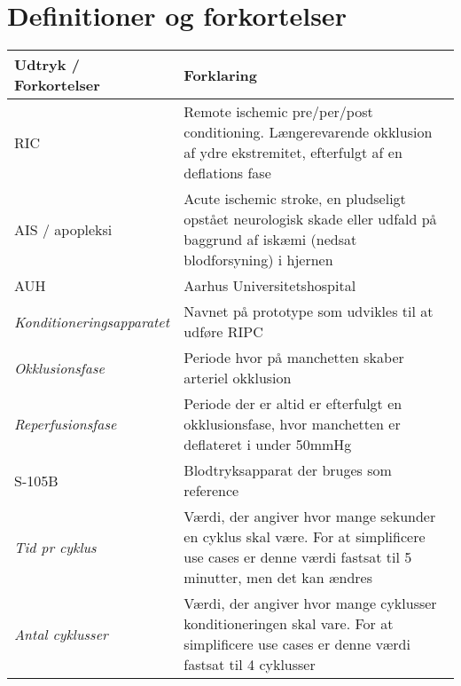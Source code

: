 	\newpage
	\section{Definitioner og forkortelser}
	\begin{longtable}{ |p{} |p{}| } 
		\hline
		\rowcolor{usDef}
		\textbf{Udtryk / Forkortelser} &  \textbf{Forklaring} \\
		\hline
		RIC & Remote ischemic pre/per/post conditioning. Længerevarende okklusion af ydre ekstremitet, efterfulgt af en deflations fase\\
		\hline
		AIS / apopleksi & Acute ischemic stroke, en pludseligt opstået neurologisk skade eller udfald på baggrund af iskæmi (nedsat blodforsyning) i hjernen \\
		\hline
		AUH & Aarhus Universitetshospital \\
		\hline
		\textit{Konditioneringsapparatet} & Navnet på prototype som udvikles til at udføre RIPC \\
		\hline
		\textit{Okklusionsfase} & Periode hvor på manchetten skaber arteriel okklusion \\
		\hline
		\textit{Reperfusionsfase} & Periode der er altid er efterfulgt en okklusionsfase, hvor manchetten er deflateret i under 50mmHg\\
		\hline
		S-105B & Blodtryksapparat der bruges som reference \\
		\hline
		\textit{Tid pr cyklus} & Værdi, der angiver hvor mange sekunder en cyklus skal være. For at simplificere use cases er denne værdi fastsat til 5 minutter, men det kan ændres \\
		\hline
		\textit{Antal cyklusser} & Værdi, der angiver hvor mange cyklusser konditioneringen skal vare. For at simplificere use cases er denne værdi fastsat til 4 cyklusser \\
		\hline
	\end{longtable}